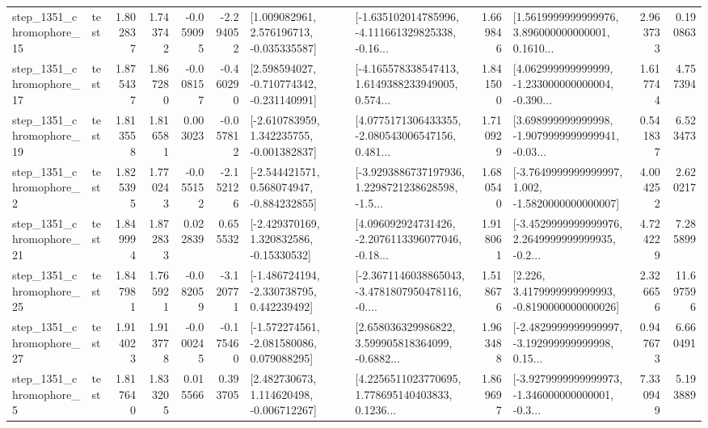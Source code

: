 \begin{tabular}{llrrrrllrlrr}
 step\_1351\_chromophore\_15 &      test &      1.802837 &    1.743742 &     -0.059095 & -2.294052 &    [1.009082961, 2.576196713, -0.035335587] &  [-1.635102014785996, -4.111661329825338, -0.16... &       1.669846 &  [1.5619999999999976, 3.896000000000001, 0.1610... &            2.963733 &          0.190863 \\
 step\_1351\_chromophore\_17 &      test &      1.875437 &    1.867280 &     -0.008157 & -0.460290 &   [2.598594027, -0.710774342, -0.231140991] &  [-4.165578338547413, 1.6149388233949005, 0.574... &       1.841500 &  [4.062999999999999, -1.233000000000004, -0.390... &            1.617744 &          4.757394 \\
 step\_1351\_chromophore\_19 &      test &      1.813558 &    1.816581 &      0.003023 & -0.057812 &   [-2.610783959, 1.342235755, -0.001382837] &  [4.0775171306433355, -2.080543006547156, 0.481... &       1.710929 &  [3.698999999999998, -1.9079999999999941, -0.03... &            0.541837 &          6.523473 \\
  step\_1351\_chromophore\_2 &      test &      1.825395 &    1.770243 &     -0.055152 & -2.152126 &   [-2.544421571, 0.568074947, -0.884232855] &  [-3.9293886737197936, 1.2298721238628598, -1.5... &       1.680540 &  [-3.7649999999999997, 1.002, -1.5820000000000007] &            4.004252 &          2.620217 \\
 step\_1351\_chromophore\_21 &      test &      1.849994 &    1.872833 &      0.022839 &  0.655532 &    [-2.429370169, 1.320832586, -0.15330532] &  [4.096092924731426, -2.2076113396077046, -0.18... &       1.918061 &  [-3.4529999999999976, 2.2649999999999935, -0.2... &            4.724229 &          7.285899 \\
 step\_1351\_chromophore\_25 &      test &      1.847981 &    1.765921 &     -0.082059 & -3.120771 &   [-1.486724194, -2.330738795, 0.442239492] &  [-2.3671146038865043, -3.4781807950478116, -0.... &       1.518676 &   [2.226, 3.4179999999999993, -0.8190000000000026] &            2.326656 &         11.697596 \\
 step\_1351\_chromophore\_27 &      test &      1.914023 &    1.913778 &     -0.000245 & -0.175460 &   [-1.572274561, -2.081580086, 0.079088295] &  [2.658036329986822, 3.599905818364099, -0.6882... &       1.963488 &  [-2.4829999999999997, -3.192999999999998, 0.15... &            0.947673 &          6.660491 \\
  step\_1351\_chromophore\_5 &      test &      1.817640 &    1.833205 &      0.015566 &  0.393705 &    [2.482730673, 1.114620498, -0.006712267] &  [4.2256511023770695, 1.778695140403833, 0.1236... &       1.869697 &  [-3.9279999999999973, -1.346000000000001, -0.3... &            7.330949 &          5.193889 \\

\end{tabular}
